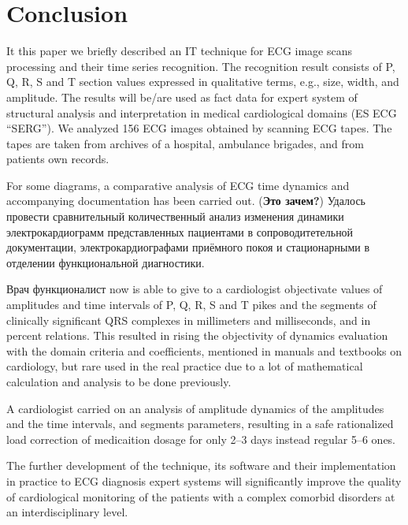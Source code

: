 \documentclass[runningheads]{AIIT}
\newcommand{\nnn}[2][rcolor]{\noindent%
\textcolor{eclr}{}\textcolor{#1}{#2}\textcolor{eclr}{}}
\begin{document}
\section*{Conclusion}
It this paper we briefly described an IT technique for ECG image scans processing and their time series recognition.  The recognition result consists of P, Q, R, S and T section values expressed in qualitative terms, e.g., size, width, and amplitude.  The results \nnn{will be/are} used as fact data for expert system of structural analysis and interpretation in medical cardiological domains (ES ECG ``SERG'').  We analyzed 156 ECG images obtained by scanning ECG tapes.  The tapes are taken from archives of a hospital, ambulance brigades, and from patients \nnn{own} records.

\nnn{For some diagrams, a comparative analysis of ECG time dynamics and accompanying documentation  has been carried out. (\textbf{Это зачем?}) Удалось провести сравнительный количественный анализ изменения динамики электрокардиограмм представленных пациентами в сопроводитетельной документации, электрокардиографами приёмного покоя и стационарными в отделении функциональной диагностики.}

\nnn{Врач функционалист} now is able to give to a cardiologist objectivate values of amplitudes and time intervals of P, Q, R, S and T pikes and the segments of clinically significant QRS complexes in millimeters and milliseconds, and in percent relations.  This resulted in rising the objectivity of dynamics evaluation with the domain criteria and coefficients, mentioned in manuals and textbooks on cardiology, but rare used in the real practice due to a lot of mathematical calculation and analysis to be done previously.

\nnn{A} cardiologist carried on an analysis of amplitude dynamics of the amplitudes and the time intervals, and segments parameters, resulting in a safe rationalized \nnn{load} correction of medicaition dosage for only 2--3 days instead regular 5--6 ones.

The further development of the technique, its software and their implementation in practice to ECG diagnosis expert systems will significantly improve the quality of cardiological monitoring of the patients with a complex comorbid disorders \nnn{at an interdisciplinary level}.
\end{document}

